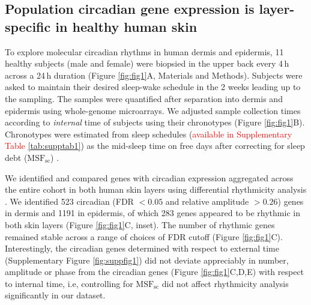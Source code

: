 \subsection*{Population circadian gene expression is layer-specific in healthy human skin} 
To explore molecular circadian rhythms in human dermis and epidermis, 11 healthy subjects (male and female) were biopsied in the upper back every 4\,h across a 24\,h duration (Figure \ref{fig:fig1}A, Materials and Methods). Subjects were asked to maintain their desired sleep-wake schedule in the 2 weeks leading up to the sampling. The samples were quantified after separation into dermis and epidermis using whole-genome microarrays. We adjusted sample collection times according to \emph{internal} time of subjects using their chronotypes (Figure \ref{fig:fig1}B). Chronotypes were estimated from sleep schedules (\textcolor{red}{available in Supplementary Table \ref{tab:supptab1}}) as the mid-sleep time on free days after correcting for sleep debt ($\textrm{MSF}_\textrm{sc}$) \cite{Vetter2021}. 

We identified and compared genes with circadian expression aggregated across the entire cohort in both human skin layers using differential rhythmicity analysis \cite{Pelikan2021}. We identified 523 circadian (FDR $<0.05$ and relative amplitude $>0.26$) genes in dermis and 1191 in epidermis, of which 283 genes appeared to be rhythmic in both skin layers (Figure \ref{fig:fig1}C, inset). The number of rhythmic genes remained stable across a range of choices of FDR cutoff (Figure \ref{fig:fig1}C). Interestingly, the circadian genes determined with respect to external time (Supplementary Figure \ref{fig:suppfig1}) did not deviate appreciably in number, amplitude or phase from the circadian genes (Figure \ref{fig:fig1}C,D,E) with respect to internal time, i.e, controlling for $\textrm{MSF}_\textrm{sc}$ did not affect rhythmicity analysis significantly in our dataset. 


